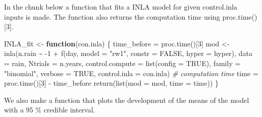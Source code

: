 \documentclass[
]{article}
\newenvironment{Shaded}{\begin{snugshade}}{\end{snugshade}}
\newcommand{\AttributeTok}[1]{\textcolor[rgb]{0.77,0.63,0.00}{#1}}
\newcommand{\CommentTok}[1]{\textcolor[rgb]{0.56,0.35,0.01}{\textit{#1}}}
\newcommand{\ConstantTok}[1]{\textcolor[rgb]{0.00,0.00,0.00}{#1}}
\newcommand{\ControlFlowTok}[1]{\textcolor[rgb]{0.13,0.29,0.53}{\textbf{#1}}}
\newcommand{\DecValTok}[1]{\textcolor[rgb]{0.00,0.00,0.81}{#1}}
\newcommand{\FunctionTok}[1]{\textcolor[rgb]{0.00,0.00,0.00}{#1}}
\newcommand{\NormalTok}[1]{#1}
\newcommand{\OtherTok}[1]{\textcolor[rgb]{0.56,0.35,0.01}{#1}}
\newcommand{\SpecialCharTok}[1]{\textcolor[rgb]{0.00,0.00,0.00}{#1}}
\newcommand{\StringTok}[1]{\textcolor[rgb]{0.31,0.60,0.02}{#1}}
\begin{document}
In the chunk below a function that fits a INLA model for given control.inla inputs is made. The function also returns the computation time using proc.time(){[}3{]}.

\begin{Shaded}
\begin{Highlighting}[]
\NormalTok{INLA\_fit }\OtherTok{\textless{}{-}} \ControlFlowTok{function}\NormalTok{(con.inla) \{}
\NormalTok{    time\_before }\OtherTok{=} \FunctionTok{proc.time}\NormalTok{()[}\DecValTok{3}\NormalTok{]}
\NormalTok{    mod }\OtherTok{\textless{}{-}} \FunctionTok{inla}\NormalTok{(n.rain }\SpecialCharTok{\textasciitilde{}} \SpecialCharTok{{-}}\DecValTok{1} \SpecialCharTok{+} \FunctionTok{f}\NormalTok{(day, }\AttributeTok{model =} \StringTok{"rw1"}\NormalTok{, }\AttributeTok{constr =} \ConstantTok{FALSE}\NormalTok{, }\AttributeTok{hyper =}\NormalTok{ hyper),}
        \AttributeTok{data =}\NormalTok{ rain, }\AttributeTok{Ntrials =}\NormalTok{ n.years, }\AttributeTok{control.compute =} \FunctionTok{list}\NormalTok{(}\AttributeTok{config =} \ConstantTok{TRUE}\NormalTok{), }\AttributeTok{family =} \StringTok{"binomial"}\NormalTok{,}
        \AttributeTok{verbose =} \ConstantTok{TRUE}\NormalTok{, }\AttributeTok{control.inla =}\NormalTok{ con.inla)}
    \CommentTok{\# computation time}
\NormalTok{    time }\OtherTok{=} \FunctionTok{proc.time}\NormalTok{()[}\DecValTok{3}\NormalTok{] }\SpecialCharTok{{-}}\NormalTok{ time\_before}
    \FunctionTok{return}\NormalTok{(}\FunctionTok{list}\NormalTok{(}\AttributeTok{mod =}\NormalTok{ mod, }\AttributeTok{time =}\NormalTok{ time))}
\NormalTok{\}}
\end{Highlighting}
\end{Shaded}

We also make a function that plots the development of the means of the model with a 95 \% credible interval.
\end{document}
